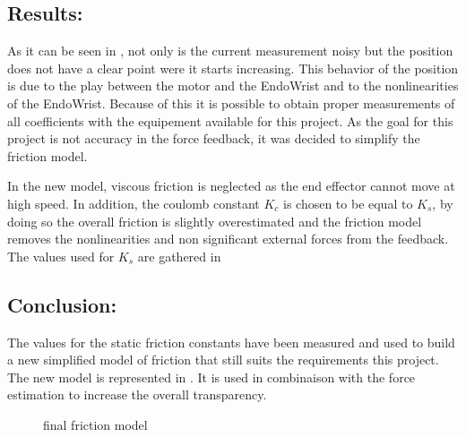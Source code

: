 \subsection*{Results:}

As it can be seen in , not only is the current measurement noisy but the position does not have a clear point were it starts increasing. This behavior of the position is due to the play between the motor and the EndoWrist and to the nonlinearities of the EndoWrist. Because of this it is possible to obtain proper measurements of all coefficients with the equipement available for this project. As the goal for this project is not accuracy in the force feedback, it was decided to simplify the friction model.

In the new model, viscous friction is neglected as the end effector cannot move at high speed. In addition, the coulomb constant $K_c$ is chosen to be equal to $K_s$, by doing so the overall friction is slightly overestimated and the friction model removes the nonlinearities and non significant external forces from the feedback. The values used for $K_s$ are gathered in 
\subsection*{Conclusion:}

The values for the static friction constants have been measured and used to build a new simplified model of friction that still suits the requirements this project. The new model is represented in . It is used in combinaison with the force estimation to increase the overall transparency.

\begin{figure}[h]
\centering
\caption{final friction model}
\label{fig:new_friction_model}
\end{figure}


